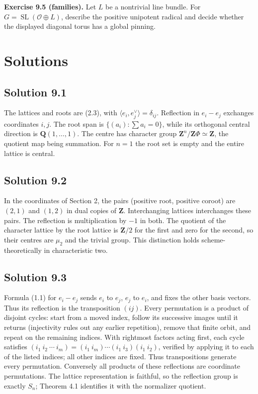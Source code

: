 \documentclass[11pt,a4paper,openany]{report}
\begin{document}
\textbf{Exercise 9.5 (families).} Let \(L\) be a nontrivial line bundle. For \(G=\operatorname{SL}(\mathcal O\oplus L)\), describe the positive unipotent radical and decide whether the displayed diagonal torus has a global pinning.

\section{Solutions}\label{AG-RG-04-solutions}

\subsection{Solution 9.1}\label{AG-RG-04-solution-9.1}

The lattices and roots are (2.3), with \(\langle e_i,e_j^\vee\rangle=\delta_{ij}\). Reflection in \(e_i-e_j\) exchanges coordinates \(i,j\). The root span is \(\{(a_i):\sum a_i=0\}\), while its orthogonal central direction is \(\mathbf Q(1,\ldots,1)\). The centre has character group \(\mathbf Z^n/\mathbf Z\Phi\simeq\mathbf Z\), the quotient map being summation. For \(n=1\) the root set is empty and the entire lattice is central.

\subsection{Solution 9.2}\label{AG-RG-04-solution-9.2}

In the coordinates of Section 2, the pairs (positive root, positive coroot) are \((2,1)\) and \((1,2)\) in dual copies of \(\mathbf Z\). Interchanging lattices interchanges these pairs. The reflection is multiplication by \(-1\) in both. The quotient of the character lattice by the root lattice is \(\mathbf Z/2\) for the first and zero for the second, so their centres are \(\mu_2\) and the trivial group. This distinction holds scheme-theoretically in characteristic two.

\subsection{Solution 9.3}\label{AG-RG-04-solution-9.3}

Formula (1.1) for \(e_i-e_j\) sends \(e_i\) to \(e_j\), \(e_j\) to \(e_i\), and fixes the other basis vectors. Thus its reflection is the transposition \((ij)\). Every permutation is a product of disjoint cycles: start from a moved index, follow its successive images until it returns (injectivity rules out any earlier repetition), remove that finite orbit, and repeat on the remaining indices. With rightmost factors acting first, each cycle satisfies \((i_1\ i_2\ \cdots\ i_m)=(i_1\ i_m)\cdots(i_1\ i_3)(i_1\ i_2)\), verified by applying it to each of the listed indices; all other indices are fixed. Thus transpositions generate every permutation. Conversely all products of these reflections are coordinate permutations. The lattice representation is faithful, so the reflection group is exactly \(S_n\); Theorem 4.1 identifies it with the normalizer quotient.
\end{document}
